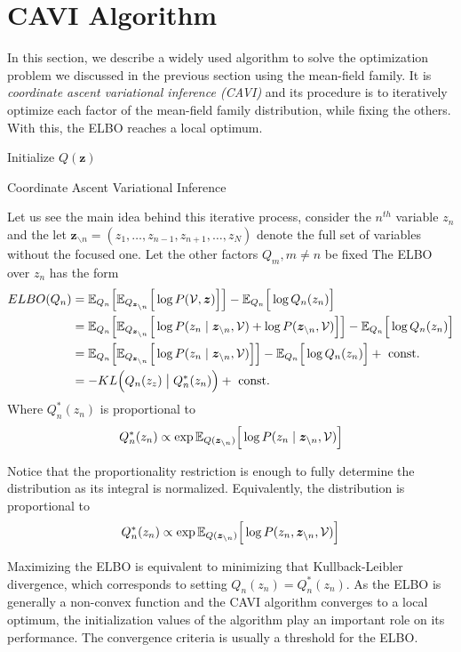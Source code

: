 \section{CAVI Algorithm }

In this section, we describe a widely used algorithm to solve the optimization problem we discussed in the previous section using the mean-field family. It is \emph{coordinate ascent variational inference (CAVI)} and its procedure is to iteratively optimize each factor of the mean-field family distribution, while fixing the others. With this, the ELBO reaches a local optimum.

 \begin{algorithm}[t]
  \SetAlgoLined
  Initialize \(Q(\bm{z})\)\;
  \;
  \caption{Coordinate Ascent Variational Inference}
  \label{alg:cavi}
\end{algorithm}

Let us see the main idea behind this iterative process, consider the \(n^{th}\) variable \(z_{n}\) and the let \(\bm{z}_{\backslash n} = (z_{1},\dots,z_{n-1},z_{n+1},\dots,z_{N})\) denote the full set of variables without the focused one. Let the other factors \(Q_{m}, m\neq n\) be fixed The ELBO over \(z_{n}\) has the form
\[
  \begin{aligned}
    ELBO(Q_{n}) &= \mathbb{E}_{Q_{n}}\Big[\mathbb{E}_{Q_{\bm{z}_{\backslash n}}}\Big[\log{P(\mathcal{V}, \bm{z})}\Big]\Big] - \mathbb{E}_{Q_{n}}\Big[\log{Q_{n}(z_{n})}\Big]\\
    &= \mathbb{E}_{Q_{n}}\Big[\mathbb{E}_{Q_{\bm{z}_{\backslash n}}}\Big[\log{P(z_{n} \mid \bm{z}_{\backslash n}, \mathcal{V})} + \log{P(\bm{z}_{\backslash n}, \mathcal{V})}\Big]\Big] - \mathbb{E}_{Q_{n}}\Big[\log{Q_{n}(z_{n})}\Big]\\
    &=  \mathbb{E}_{Q_{n}}\Big[\mathbb{E}_{Q_{\bm{z}_{\backslash n}}}\Big[\log{P(z_{n} \mid \bm{z}_{\backslash n}, \mathcal{V})}\Big]\Big] - \mathbb{E}_{Q_{n}}\Big[\log{Q_{n}(z_{n})}\Big] + \text{ const. }\\
    &= - KL\Big(Q_{n}(z_{z}) \bigm| Q_{n}^{*}(z_{n})\Big) + \text{ const.}
  \end{aligned}
\]
Where \(Q_{n}^{*}(z_{n}) \) is proportional to
\[
  Q_{n}^{*}(z_{n}) \propto \exp{\mathbb{E}_{Q(\bm{z}_{\backslash n})}\Big[\log{P(z_{n} \mid \bm{z}_{\backslash n}, \mathcal{V})}\Big]}
\]

Notice that the proportionality restriction is enough to fully determine the distribution as its integral is normalized. Equivalently, the distribution is proportional to
\[
    Q_{n}^{*}(z_{n}) \propto \exp{\mathbb{E}_{Q(\bm{z}_{\backslash n})}\Big[\log{P(z_{n}, \bm{z}_{\backslash n}, \mathcal{V})}\Big]}
\]

Maximizing the ELBO is equivalent to minimizing that Kullback-Leibler divergence, which corresponds to setting \(Q_{n}(z_{n}) = Q_{n}^{*}(z_{n})\).
As the ELBO is generally a non-convex function and the CAVI algorithm converges to a local optimum, the initialization values of the algorithm play an important role on its performance.
The convergence criteria is usually a threshold for the ELBO.
